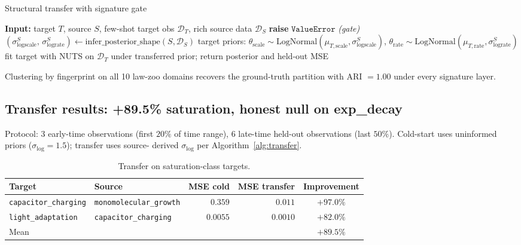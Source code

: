 \documentclass{article}
\begin{document}
\begin{algorithm}[h]
\caption{Structural transfer with signature gate}
\label{alg:transfer}
\begin{algorithmic}[1]
\State \textbf{Input:} target $T$, source $S$, few-shot target obs
$\mathcal{D}_{T}$, rich source data $\mathcal{D}_{S}$
  \State \textbf{raise} $\texttt{ValueError}$ \textit{(gate)}
\EndIf
\State $(\sigma_{\log\text{scale}}^{S},\, \sigma_{\log\text{rate}}^{S})
  \gets \mathrm{infer\_posterior\_shape}(S, \mathcal{D}_{S})$
\State target priors:
  $\theta_{\text{scale}} \sim \mathrm{LogNormal}(\mu_{T, \text{scale}}, \sigma_{\log\text{scale}}^{S})$,
  $\theta_{\text{rate}} \sim \mathrm{LogNormal}(\mu_{T, \text{rate}}, \sigma_{\log\text{rate}}^{S})$
\State fit target with NUTS on $\mathcal{D}_{T}$ under transferred
prior; return posterior and held-out MSE
\end{algorithmic}
\end{algorithm}

Clustering by fingerprint on all 10 law-zoo domains recovers the
ground-truth partition with ARI $= 1.00$ under every signature layer.

\subsection{Transfer results: +89.5\% saturation, honest null on exp\_decay}
\label{sec:transfer-results}

Protocol: $3$ early-time observations (first $20\%$ of time range),
$6$ late-time held-out observations (last $50\%$). Cold-start uses
uninformed priors ($\sigma_{\log} = 1.5$); transfer uses source-
derived $\sigma_{\log}$ per Algorithm~\ref{alg:transfer}.

\begin{table}[h]
\centering
\caption{Transfer on saturation-class targets.}
\label{tab:transfer-saturation}
\begin{tabular}{llrrc}
\toprule
Target & Source & MSE cold & MSE transfer & Improvement \\
\midrule
\texttt{capacitor\_charging} & \texttt{monomolecular\_growth} & $0.359$  & $0.011$  & $\mathbf{+97.0\%}$ \\
\texttt{light\_adaptation}   & \texttt{capacitor\_charging}   & $0.0055$ & $0.0010$ & $\mathbf{+82.0\%}$ \\
\midrule
\multicolumn{4}{l}{Mean}                                                 & $\mathbf{+89.5\%}$ \\
\bottomrule
\end{tabular}
\end{table}
\end{document}
